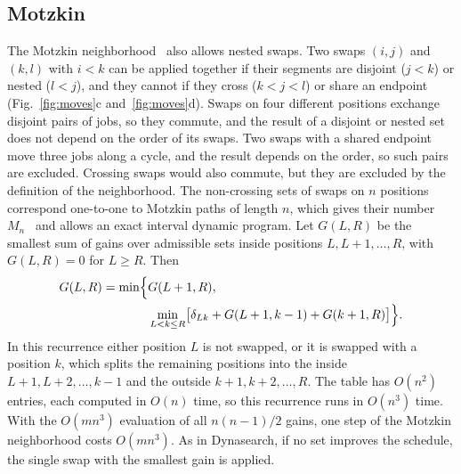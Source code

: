 \documentclass[10pt,twoside,twocolumn,a4paper]{article}
\newif\ifrevmarks \revmarksfalse
\newcommand{\rev}[1]{\ifrevmarks\textcolor{red}{#1}\else#1\fi}
\newenvironment{revblock}{\ifrevmarks\color{red}\fi}{}
\begin{document}
\subsection{\rev{Motzkin}}
\begin{revblock}
The Motzkin neighborhood~\cite{Motzkin_PWR_EXIT,Motzkin_PWR} also allows nested swaps. Two swaps $(i,j)$ and $(k,l)$ with $i<k$ can be applied together if their segments are disjoint ($j<k$) or nested ($l<j$), and they cannot if they cross ($k<j<l$) or share an endpoint (Fig.~\ref{fig:moves}c and~\ref{fig:moves}d). Swaps on four different positions exchange disjoint pairs of jobs, so they commute, and the result of a disjoint or nested set does not depend on the order of its swaps. Two swaps with a shared endpoint move three jobs along a cycle, and the result depends on the order, so such pairs are excluded. Crossing swaps would also commute, but they are excluded by the definition of the neighborhood. The non-crossing sets of swaps on $n$ positions correspond one-to-one to Motzkin paths of length $n$, which gives their number $M_n$~\cite{motzkin1948} and allows an exact interval dynamic program. Let $G(L,R)$ be the smallest sum of gains over admissible sets inside positions $L,L+1,\dots,R$, with $G(L,R)=0$ for $L\ge R$. Then
\begin{equation}
\begin{aligned}
G(L,R)=\min\Bigl\{&G(L+1,R),\\
&\min_{L<k\le R}\bigl[\delta_{Lk}+G(L+1,k-1)+G(k+1,R)\bigr]\Bigr\}.
\end{aligned}\label{eq:motz}
\end{equation}
In this recurrence either position $L$ is not swapped, or it is swapped with a position $k$, which splits the remaining positions into the inside $L+1,L+2,\dots,k-1$ and the outside $k+1,k+2,\dots,R$. The table has $O(n^2)$ entries, each computed in $O(n)$ time, so this recurrence runs in $O(n^3)$ time. With the $O(mn^3)$ evaluation of all $n(n-1)/2$ gains, one step of the Motzkin neighborhood costs $O(mn^3)$. As in Dynasearch, if no set improves the schedule, the single swap with the smallest gain is applied.
\end{revblock}
\end{document}

